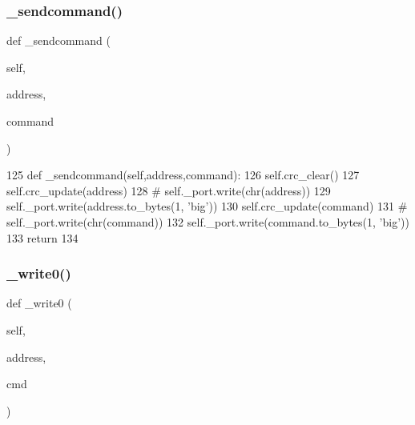 \subsubsection{\texorpdfstring{\+\_\+sendcommand()}{\_sendcommand()}}
{\footnotesize\ttfamily def \+\_\+sendcommand (\begin{DoxyParamCaption}\item[{}]{self,  }\item[{}]{address,  }\item[{}]{command }\end{DoxyParamCaption})\hspace{0.3cm}{\ttfamily [private]}}


\begin{DoxyCode}
125     \textcolor{keyword}{def }\_sendcommand(self,address,command):
126         self.crc\_clear()
127         self.crc\_update(address)
128 \textcolor{comment}{#       self.\_port.write(chr(address))}
129         self.\_port.write(address.to\_bytes(1, \textcolor{stringliteral}{'big'}))
130         self.crc\_update(command)
131 \textcolor{comment}{#       self.\_port.write(chr(command))}
132         self.\_port.write(command.to\_bytes(1, \textcolor{stringliteral}{'big'}))
133         \textcolor{keywordflow}{return}
134 
\end{DoxyCode}
\mbox{\label{classtoxic__hardware_1_1roboclaw__3_1_1Roboclaw_a53e66b2abf6128eab409cb25dcf5f39b}} 
\subsubsection{\texorpdfstring{\+\_\+write0()}{\_write0()}}
{\footnotesize\ttfamily def \+\_\+write0 (\begin{DoxyParamCaption}\item[{}]{self,  }\item[{}]{address,  }\item[{}]{cmd }\end{DoxyParamCaption})\hspace{0.3cm}{\ttfamily [private]}}



